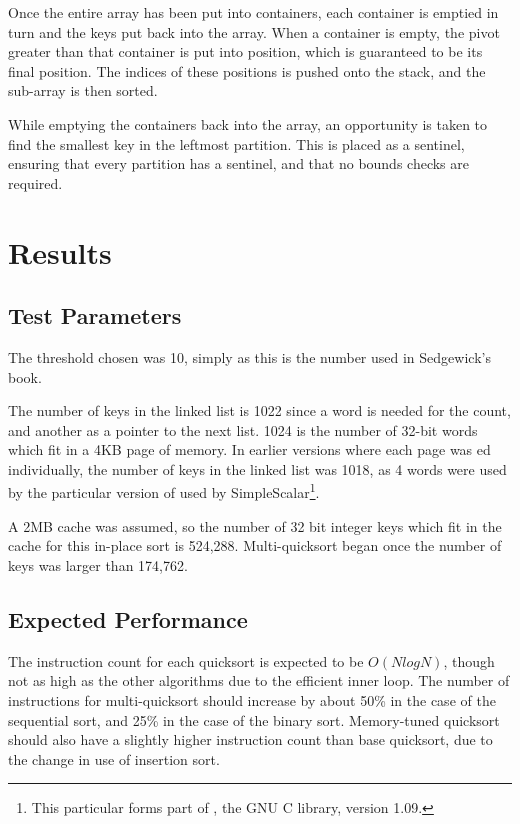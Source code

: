 Once the entire array has been put into containers, each container is emptied
in turn and the keys put back into the array. When a container is empty, the
pivot greater than that container is put into position, which is guaranteed to
be its final position.  The indices of these positions is pushed onto the
stack, and the sub-array is then sorted.

While emptying the containers back into the array, an opportunity is taken to
find the smallest key in the leftmost partition. This is placed as a sentinel,
ensuring that every partition has a sentinel, and that no bounds checks are
required.

\section{Results}

\subsection{Test Parameters}
The threshold chosen was 10, simply as this is the number used in Sedgewick's
book.

The number of keys in the linked list is 1022 since a word is needed for the
count, and another as a pointer to the next list. 1024 is the number of 32-bit
words which fit in a 4KB page of memory. In earlier versions where each page was
ed individually, the number of keys in the linked list was 1018,
as 4 words were used by the particular version of  used by
SimpleScalar\footnote{This particular  forms part of
, the GNU C library, version 1.09.}.

A 2MB cache was assumed, so the number of 32 bit integer keys which fit in the
cache for this in-place sort is 524,288. Multi-quicksort began once the number
of keys was larger than 174,762.

\subsection{Expected Performance}

The instruction count for each quicksort is expected to be $O(NlogN)$, though
not as high as the other algorithms due to the efficient inner loop.  The number
of instructions for multi-quicksort should increase by about 50\% in the case of
the sequential sort, and 25\% in the case of the binary sort. Memory-tuned
quicksort should also have a slightly higher instruction count than base
quicksort, due to the change in use of insertion sort.

